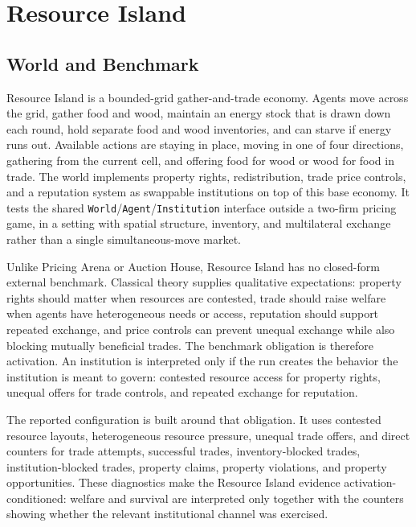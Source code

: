 \documentclass[11pt]{article}
\newcommand{\code}[1]{\texttt{#1}}
\begin{document}
\section{Resource Island}

\subsection{World and Benchmark}

Resource Island is a bounded-grid gather-and-trade economy. Agents move across
the grid, gather food and wood, maintain an energy stock that is drawn down each
round, hold separate food and wood inventories, and can starve if energy runs
out. Available actions are staying in place, moving in one of four directions,
gathering from the current cell, and offering food for wood or wood for food in
trade. The world implements property rights, redistribution, trade price
controls, and a reputation system as swappable institutions on top of this base
economy. It tests the shared \code{World}/\code{Agent}/\code{Institution}
interface outside a two-firm pricing game, in a setting with spatial structure,
inventory, and multilateral exchange rather than a single simultaneous-move
market.

Unlike Pricing Arena or Auction House, Resource Island has no closed-form
external benchmark. Classical theory supplies qualitative expectations:
property rights should matter when resources are contested, trade should raise
welfare when agents have heterogeneous needs or access, reputation should support
repeated exchange, and price controls can prevent unequal exchange while also
blocking mutually beneficial trades. The benchmark obligation is therefore
activation. An institution is interpreted only if the run creates the behavior
the institution is meant to govern: contested resource access for property
rights, unequal offers for trade controls, and repeated exchange for reputation.

The reported configuration is built around that obligation. It uses contested
resource layouts, heterogeneous resource pressure, unequal trade offers, and
direct counters for trade attempts, successful trades, inventory-blocked trades,
institution-blocked trades, property claims, property violations, and property
opportunities. These diagnostics make the Resource Island evidence
activation-conditioned: welfare and survival are interpreted only together with
the counters showing whether the relevant institutional channel was exercised.
\end{document}

